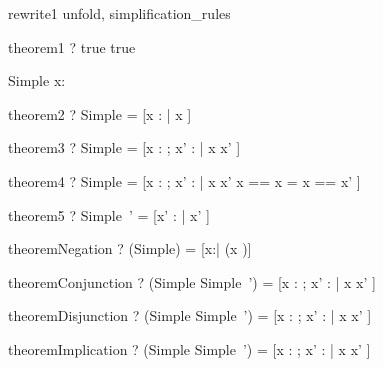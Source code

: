 \begin{zsection}
\SECTION rewrite1 \parents unfold, simplification\_rules
\end{zsection}

\begin{theorem}{theorem1}
  \vdash? true \iff true
\end{theorem}




\begin{schema}{Simple}
  x: \nat
\end{schema}

\begin{theorem}{theorem2}
  \vdash? Simple =
    [x : \arithmos | x \in \nat]
\end{theorem}

\begin{theorem}{theorem3}
  \vdash? \Delta Simple =
    [x : \arithmos; x' : \arithmos | x \in \nat \land x' \in \nat]
\end{theorem}

\begin{theorem}{theorem4}
  \vdash? \Xi Simple =
    [x : \arithmos; x' : \arithmos | x \in \nat \land x' \in \nat \land
       \lblot x == x \rblot  = \lblot x == x' \rblot ]
\end{theorem}

\begin{theorem}{theorem5}
  \vdash? Simple~' =
    [x' : \arithmos | x' \in \nat]
\end{theorem}

\begin{theorem}{theoremNegation}
  \vdash? (\lnot Simple) = [x:\arithmos | \lnot (x \in \nat)]
\end{theorem}

\begin{theorem}{theoremConjunction}
  \vdash? (Simple \land Simple~') = [x : \arithmos; x' : \arithmos | x \in \nat \land x' \in \nat]
\end{theorem}

\begin{theorem}{theoremDisjunction}
  \vdash? (Simple \lor Simple~') = [x : \arithmos; x' : \arithmos | x \in \nat \lor x' \in \nat]
\end{theorem}

\begin{theorem}{theoremImplication}
  \vdash? (Simple \implies Simple~') = [x : \arithmos; x' : \arithmos | x \in \nat \implies x' \in \nat]
\end{theorem}


